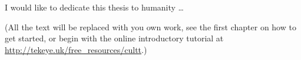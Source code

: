 
\begin{dedication} 

I would like to dedicate this thesis to humanity \dots

(All the text will be replaced with you own work, see the first chapter on how to get started, or begin with the online introductory tutorial at \url{http://tekeye.uk/free_resources/cultt}.)

\end{dedication}


